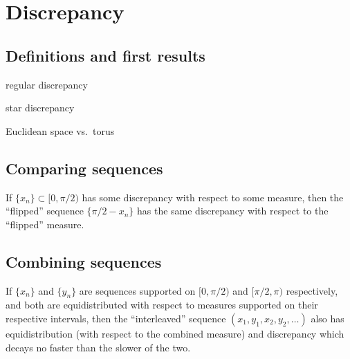 
\chapter{Discrepancy}





\section{Definitions and first results}

regular discrepancy

star discrepancy

Euclidean space vs.~torus





\section{Comparing sequences}

If $\{x_n\}\subset [0,\pi/2)$ has some discrepancy with respect to some 
measure, then the ``flipped'' sequence $\{\pi/2-x_n\}$ has the same discrepancy 
with respect to the ``flipped'' measure. 





\section{Combining sequences}

If $\{x_n\}$ and $\{y_n\}$ are sequences supported on $[0,\pi/2)$ and 
$[\pi/2,\pi)$ respectively, and both are equidistributed with respect to 
measures supported on their respective intervals, then the ``interleaved'' 
sequence $(x_1,y_1,x_2,y_2,\dots)$ also has equidistribution (with respect to 
the combined measure) and discrepancy which decays no faster than the slower of 
the two. 
